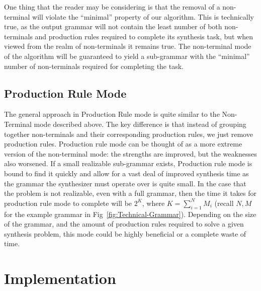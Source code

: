 \documentclass[acmsmall, nonacm]{acmart}
\begin{document}
One thing that the reader may be considering is that the removal of a non-terminal will violate the ``minimal'' property of our algorithm. This is technically true, as the output grammar will not contain the least number of both non-terminals and production rules required to complete its synthesis task, but when viewed from the realm of non-terminals it remains true. The non-terminal mode of the algorithm will be guaranteed to yield a sub-grammar with the ``minimal'' number of non-terminals required for completing the task.

\subsection{Production Rule Mode}
The general approach in Production Rule mode is quite similar to the Non-Terminal mode described above. The key difference is that instead of grouping together non-terminals and their corresponding production rules, we just remove production rules. Production rule mode can be thought of as a more extreme version of the non-terminal mode: the strengths are improved, but the weaknesses also worsened.
If a small realizable sub-grammar exists, Production rule mode is bound to find it quickly and allow for a vast deal of improved synthesis time as the grammar the synthesizer must operate over is quite small. In the case that the problem is not realizable, even with a full grammar, then the time it takes for production rule mode to complete will be $2^K$, where $K = \sum_{i = 1}^{N} M_i$ (recall $N,M$ for the example grammar in Fig~\ref{fig:Technical-Grammar}).
Depending on the size of the grammar, and the amount of production rules required
to solve a given synthesis problem, this mode could be highly beneficial or a complete waste of time.

\section{Implementation}
\end{document}
